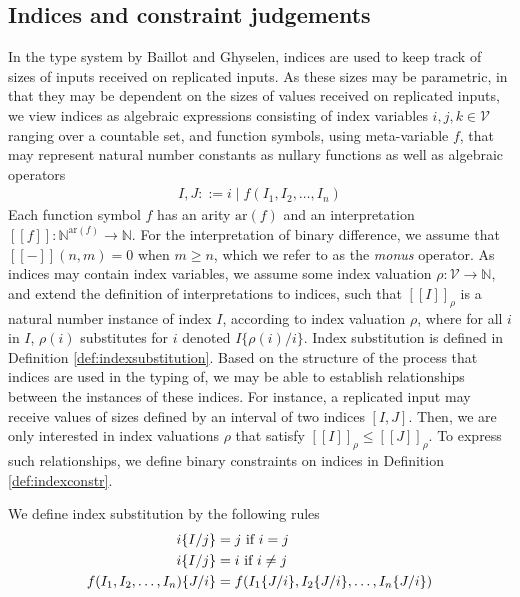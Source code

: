 \subsection{Indices and constraint judgements}\label{sec:indicesandjudgements}
In the type system by Baillot and Ghyselen, indices are used to keep track of sizes of inputs received on replicated inputs. As these sizes may be parametric, in that they may be dependent on the sizes of values received on replicated inputs, we view indices as algebraic expressions consisting of index variables $i,j,k\in\mathcal{V}$ ranging over a countable set, and function symbols, using meta-variable $f$, that may represent natural number constants as nullary functions as well as algebraic operators
\begin{align*}
    I,J ::= i \mid f(I_1,I_2,\dots,I_n)
\end{align*}
Each function symbol $f$ has an arity $\text{ar}(f)$ and an interpretation $[\![f]\!] : \mathbb{N}^{\text{ar}(f)} \rightarrow \mathbb{N}$. For the interpretation of binary difference, we assume that $[\![-]\!](n,m) = 0$ when $m \geq n$, which we refer to as the \textit{monus} operator. As indices may contain index variables, we assume some index valuation $\rho : \mathcal{V} \rightarrow \mathbb{N}$, and extend the definition of interpretations to indices, such that $[\![I]\!]_\rho$ is a natural number instance of index $I$, according to index valuation $\rho$, where for all $i$ in $I$, $\rho(i)$ substitutes for $i$ denoted $I\{\rho(i)/i\}$. Index substitution is defined in Definition \ref{def:indexsubstitution}. Based on the structure of the process that indices are used in the typing of, we may be able to establish relationships between the instances of these indices. For instance, a replicated input may receive values of sizes defined by an interval of two indices $[I,J]$. Then, we are only interested in index valuations $\rho$ that satisfy $[\![I]\!]_\rho \leq [\![J]\!]_\rho$. To express such relationships, we define binary constraints on indices in Definition \ref{def:indexconstr}.

\begin{definition}\label{def:indexsubstitution}
    We define index substitution by the following rules
    \begin{align*}
        i\{I/j\} &= j \text{ if } i = j\\
        i\{I/j\} &= i \text{ if } i \not = j\\
        f(I_1, I_2, \dots, I_n)\{J/i\} &= f(I_1\{J/i\}, I_2\{J/i\}, \dots, I_n\{J/i\})
    \end{align*}
\end{definition}


